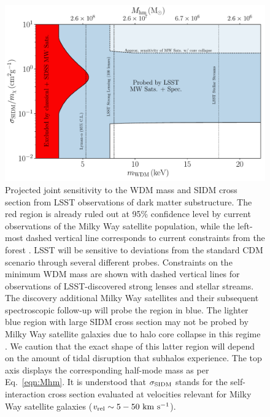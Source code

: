 \begin{figure}[t]
\centering
\includegraphics[width=0.6\columnwidth]{figures/SIDM_WDM_figw_coll.pdf}
\caption{\label{fig:sidm_wdm} Projected joint sensitivity to the WDM mass and SIDM cross section from LSST observations of dark matter substructure. 
The red region is already ruled out at 95\% confidence level by current observations of the Milky Way satellite population, while the left-most dashed vertical line corresponds to current constraints from the \Lya forest \citep{2017PhRvD..96b3522I}.
LSST will be sensitive to deviations from the standard CDM scenario through several different probes.
Constraints on the minimum WDM mass are shown with dashed vertical lines for observations of LSST-discovered strong lenses and stellar streams.
The discovery additional Milky Way satellites and their subsequent spectroscopic follow-up will probe the region in blue.
The lighter blue region with large SIDM cross section may not be probed by Milky Way satellite galaxies due to halo core collapse in this regime \citep{Nishikawa:2019lsc}. 
We caution that the exact shape of this latter region will depend on the amount of tidal disruption that subhalos experience.  
The top axis displays the corresponding half-mode mass as per Eq.~\eqref{eqn:Mhm}. 
It is understood that $\sigma_{\rm SIDM}$ stands for the self-interaction cross section evaluated at velocities relevant for Milky Way satellite galaxies ($v_{\rm rel}\sim5-50 \mathrm{\,\mathrm{\,km}\,\mathrm{\,s}^{-1}}$). }
\end{figure}

